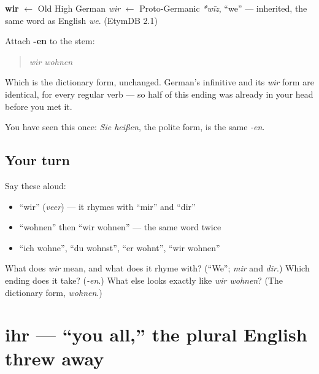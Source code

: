 \begin{cousinweb}
\textbf{wir} $\leftarrow$ Old High German \emph{wir} $\leftarrow$ Proto-Germanic \emph{*wīz}, \textquotedblleft{}we\textquotedblright{} — inherited, the same word as English \emph{we}. (EtymDB 2.1)
\end{cousinweb}

\begin{grammarlens}[title={Grammar Lens: wir takes -en}]
Attach \textbf{-en} to the stem:

\begin{quote}
\emph{wir wohnen}
\end{quote}

Which is the dictionary form, unchanged. German's infinitive and its \emph{wir} form are identical, for every regular verb — so half of this ending was already in your head before you met it.

You have seen this once: \emph{Sie heißen}, the polite form, is the same \emph{-en}.
\end{grammarlens}

\subsection*{Your turn}
Say these aloud:

\begin{itemize}
\raggedright
  \item \textquotedblleft{}wir\textquotedblright{} (\emph{veer}) — it rhymes with \textquotedblleft{}mir\textquotedblright{} and \textquotedblleft{}dir\textquotedblright{}
  \item \textquotedblleft{}wohnen\textquotedblright{} then \textquotedblleft{}wir wohnen\textquotedblright{} — the same word twice
  \item \textquotedblleft{}ich wohne\textquotedblright{}, \textquotedblleft{}du wohnst\textquotedblright{}, \textquotedblleft{}er wohnt\textquotedblright{}, \textquotedblleft{}wir wohnen\textquotedblright{}
\end{itemize}

\begin{tcolorbox}[breakable,colback=teal!4,colframe=teal!35!black,title={Before you move on}]
What does \emph{wir} mean, and what does it rhyme with? (\textquotedblleft{}We\textquotedblright{}; \emph{mir} and \emph{dir}.) Which ending does it take? (\emph{-en}.) What else looks exactly like \emph{wir wohnen}? (The dictionary form, \emph{wohnen}.)
\end{tcolorbox}
\section[ihr]{ihr — \textquotedblleft{}you all,\textquotedblright{} the plural English threw away}

